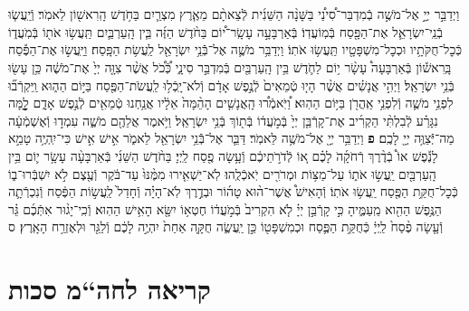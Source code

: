 \documentclass[twoside, openany, parskip=half, 11pt]{book}
\begin{document}
\begin{sometimes}
\begin{footnotesize}
\begin{multicols}{2}
\\
\\
וַיְדַבֵּ֣ר יְיָ֣ אֶל־מֹשֶׁ֣ה בְֿמִדְבַּר־סִ֠ינַ֠י בַּשָּׁנָ֨ה הַשֵּׁנִ֜ית לְֿצֵאתָ֨ם מֵאֶ֧רֶץ מִצְרַ֛יִם בַּחֹ֥דֶשׁ הָֽרִאשׁ֖וֹן לֵאמֹֽר׃ וְֿיַֽעֲשׂ֧וּ בְֿנֵֽי־יִשְׂרָאֵ֛ל אֶת־הַפָּ֖סַח בְּֿמֽוֹעֲדֽוֹ׃ בְּֿאַרְבָּעָ֣ה עָשָֽׂר־י֠וֹם בַּחֹ֨דֶשׁ הַזֶּ֜ה בֵּ֧ין הָֽעַרְבַּ֛יִם תַּֽעֲשׂ֥וּ אֹת֖וֹ בְּֿמֹֽעֲד֑וֹ כְּֿכׇל־חֻקֹּתָ֥יו וּכְכׇל־מִשְׁפָּטָ֖יו תַּֽעֲשׂ֥וּ אֹתֽוֹ׃ וַיְדַבֵּ֥ר מֹשֶׁ֛ה אֶל־בְּֿֿנֵ֥י יִשְׂרָאֵ֖ל לַֽעֲשׂ֥ת הַפָּֽסַח׃ וַיַּֽעֲשׂ֣וּ אֶת־הַפֶּ֡סַח בָּֽרִאשׁ֡וֹן בְּֿאַרְבָּעָה֩ עָשָׂ֨ר י֥וֹם לַחֹ֛דֶשׁ בֵּ֥ין הָֽעַרְבַּ֖יִם בְּֿמִדְבַּ֣ר סִינָ֑י כְּֿ֠כֹ֠ל אֲשֶׁ֨ר צִוָּ֤ה יְיָ֙ אֶת־מֹשֶׁ֔ה כֵּ֥ן עָשׂ֖וּ בְּֿנֵ֥י יִשְׂרָאֵֽל׃
וַיְהִ֣י אֲנָשִׁ֗ים אֲשֶׁ֨ר הָי֤וּ טְֿמֵאִים֙ לְֿנֶ֣פֶשׁ אָדָ֔ם וְֿלֹא־יָֽכְֿל֥וּ לַֽעֲשֹׂת־הַפֶּ֖סַח בַּיּ֣וֹם הַה֑וּא וַֽיִּקְרְֿב֞וּ לִפְנֵ֥י מֹשֶׁ֛ה וְֿלִפְנֵ֥י אַֽהֲרֹ֖ן בַּיּ֥וֹם הַהֽוּא׃ וַ֠יֹּֽאמְֿר֠וּ הָֽאֲנָשִׁ֤ים הָהֵ֨מָּה֙ אֵלָ֔יו אֲנַ֥חְנוּ טְֿמֵאִ֖ים לְֿנֶ֣פֶשׁ אָדָ֑ם לׇׇׇׇׇׇָ֣מָּה נִגָּרַ֗ע לְֿבִלְתִּ֨י הַקְרִ֜יב אֶת־קָרְֿבַּ֤ן יְיָ֙ בְּֿמֹ֣עֲד֔וֹ בְּֿת֖וֹךְ בְּֿנֵ֥י יִשְׂרָאֵֽל׃ וַיֹּ֥אמֶר אֲלֵהֶ֖ם מֹשֶׁ֑ה עִמְד֣וּ וְֿאֶשְׁמְֿעָ֔ה מַה־יְּֿֿצַוֶּ֥ה יְיָ֖ לָכֶֽם׃ \textbf{פ}
וַיְדַבֵּ֥ר יְיָ֖ אֶל־מֹשֶׁ֥ה לֵּאמֹֽר׃ דַּבֵּ֛ר אֶל־בְּֿֿנֵ֥י יִשְׂרָאֵ֖ל לֵאמֹ֑ר אִ֣ישׁ אִ֣ישׁ כִּי־יִֽהְיֶ֥ה טָמֵ֣א לָנֶ֡פֶשׁ אוֹ֩ בְֿדֶ֨רֶךְ רְֿחֹקָ֜הֹ לָכֶ֗ם א֚וֹ לְֿדֹרֹ֣תֵיכֶ֔ם וְֿעָ֥שָׂה פֶ֖סַח לַֽיְיָ׃ בַּחֹ֨דֶשׁ הַשֵּׁנִ֜י בְּֿאַרְבָּעָ֨ה עָשָׂ֥ר י֛וֹם בֵּ֥ין הָֽעַרְבַּ֖יִם יַֽעֲשׂ֣וּ אֹת֑וֹ עַל־מַצּ֥וֹת וּמְרֹרִ֖ים יֹֽאכְֿלֻֽהוּ׃ לֹֽא־יַשְׁאִ֤ירוּ מִמֶּ֨נּוּ֙ עַד־בֹּ֔קֶר וְֿעֶ֖צֶם לֹ֣א יִשְׁבְּֿרוּ־ב֑וֹ כְּֿכׇל־חֻקַּ֥ת הַפֶּ֖סַח יַֽעֲשׂ֥וּ אֹתֽוֹ׃ וְֿהָאִישׁ֩ אֲשֶׁר־ה֨וּא טָה֜וֹר וּבְדֶ֣רֶךְ לֹֽא־הָיָ֗ה וְֿחָדַל֙ לַֽעֲשׂ֣וֹת הַפֶּ֔סַח וְֿנִכְרְֿתָ֛ה הַנֶּ֥פֶשׁ הַהִ֖וא מֵֽעַמֶּ֑יהָ כִּ֣י קָרְֿבַּ֣ן יְיָ֗ לֹ֤א הִקְרִיב֙ בְּֿמֹ֣עֲד֔וֹ חֶטְא֥וֹ יִשָּׂ֖א הָאִ֥ישׁ הַהֽוּא׃ וְֿכִֽי־יָג֨וּר אִתְּֿכֶ֜ם גֵּ֗ר וְֿעָ֤שָׂה פֶ֨סַח֙ לַֽיְיָ֔ כְּֿחֻקַּ֥ת הַפֶּ֛סַח וּכְמִשְׁפָּט֖וֹ כֵּ֣ן יַֽעֲשֶׂ֑ה חֻקָּ֤ה אַחַת֙ יִהְיֶ֣ה לָכֶ֔ם וְֿלַגֵּ֖ר וּלְאֶזְרַ֥ח הָאָֽרֶץ׃ ס

\end{multicols}

\clearpage

\section[חה“מ סכות]{קריאה לחה“מ סכות}


\end{footnotesize}
\end{sometimes}
\end{document}
